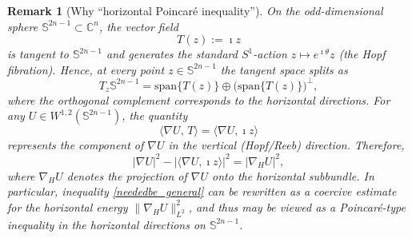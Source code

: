 \documentclass[11pt]{amsart}
\newtheorem{remark}[theorem]{Remark}
\numberwithin{equation}{section}
\begin{document}
\begin{remark}[Why ``horizontal Poincar\'e inequality'']
On the odd-dimensional sphere $\mathbb S^{2n-1}\subset\mathbb C^{n}$, the vector field
\[
T(z):=\imath z
\]
is tangent to $\mathbb S^{2n-1}$ and generates the standard $S^{1}$-action
$z\mapsto e^{\imath\theta}z$ (the Hopf fibration). Hence, at every point
$z\in\mathbb S^{2n-1}$ the tangent space splits as
\[
T_{z}\mathbb S^{2n-1}=\mathrm{span}\{T(z)\}\oplus \bigl(\mathrm{span}\{T(z)\}\bigr)^{\perp},
\]
where the orthogonal complement corresponds to the \emph{horizontal directions}.
For any $U\in W^{1,2}(\mathbb S^{2n-1})$, the quantity
\[
\langle\nabla U,\,T\rangle=\langle\nabla U,\imath z\rangle
\]
represents the component of $\nabla U$ in the vertical (Hopf/Reeb) direction.
Therefore,
\[
|\nabla U|^{2}-|\langle\nabla U,\imath z\rangle|^{2}
=|\nabla_{H}U|^{2},
\]
where $\nabla_{H}U$ denotes the projection of $\nabla U$ onto the horizontal
subbundle. In particular, inequality \eqref{neededbe_general} can be rewritten as
a coercive estimate for the horizontal energy $\|\nabla_{H}U\|_{L^{2}}^{2}$,
and thus may be viewed as a \emph{Poincar\'e-type inequality} in the horizontal
directions on $\mathbb S^{2n-1}$.
\end{remark}
\end{document}
